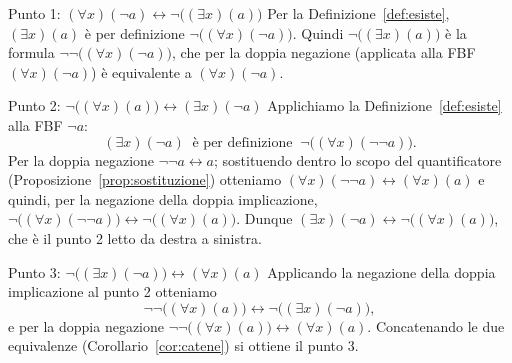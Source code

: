 \begin{concetto}
\begin{dimostrazione}
    \begin{caso}{Punto 1: $(\forall x)(\neg a) \leftrightarrow \neg\big((\exists x)(a)\big)$}
        Per la Definizione~\ref{def:esiste}, $(\exists x)(a)$ è per definizione $\neg\big((\forall x)(\neg a)\big)$.
    Quindi $\neg\big((\exists x)(a)\big)$ è la formula $\neg\neg\big((\forall x)(\neg a)\big)$, che per la doppia negazione
    (applicata alla FBF $(\forall x)(\neg a)$) è equivalente a $(\forall x)(\neg a)$.
    \end{caso}
    \begin{caso}{Punto 2: $\neg\big((\forall x)(a)\big) \leftrightarrow (\exists x)(\neg a)$}
        Applichiamo la Definizione~\ref{def:esiste} alla FBF $\neg a$:
    \[ (\exists x)(\neg a) \ \text{ è per definizione } \ \neg\big((\forall x)(\neg\neg a)\big). \]
    Per la doppia negazione $\neg\neg a \leftrightarrow a$; sostituendo dentro lo scopo del quantificatore
    (Proposizione~\ref{prop:sostituzione}) otteniamo $(\forall x)(\neg\neg a) \leftrightarrow (\forall x)(a)$ e quindi,
    per la negazione della doppia implicazione, $\neg\big((\forall x)(\neg\neg a)\big) \leftrightarrow \neg\big((\forall x)(a)\big)$.
    Dunque $(\exists x)(\neg a) \leftrightarrow \neg\big((\forall x)(a)\big)$, che è il punto 2 letto da destra a sinistra.
    \end{caso}
    \begin{caso}{Punto 3: $\neg\big((\exists x)(\neg a)\big) \leftrightarrow (\forall x)(a)$}
        Applicando la negazione della doppia implicazione al punto 2 otteniamo
    \[ \neg\neg\big((\forall x)(a)\big) \leftrightarrow \neg\big((\exists x)(\neg a)\big), \]
    e per la doppia negazione $\neg\neg\big((\forall x)(a)\big) \leftrightarrow (\forall x)(a)$.
    Concatenando le due equivalenze (Corollario~\ref{cor:catene}) si ottiene il punto 3.
    \end{caso}
\end{dimostrazione}
\end{concetto}

